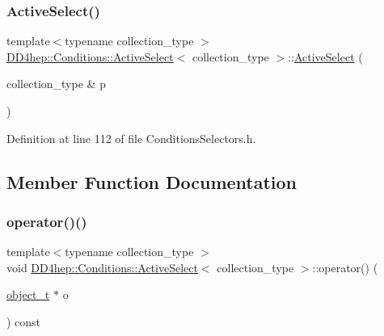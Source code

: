 \subsubsection{\texorpdfstring{Active\+Select()}{ActiveSelect()}}
{\footnotesize\ttfamily template$<$typename collection\+\_\+type $>$ \\
\hyperlink{class_d_d4hep_1_1_conditions_1_1_active_select}{D\+D4hep\+::\+Conditions\+::\+Active\+Select}$<$ collection\+\_\+type $>$\+::\hyperlink{class_d_d4hep_1_1_conditions_1_1_active_select}{Active\+Select} (\begin{DoxyParamCaption}\item[{collection\+\_\+type \&}]{p }\end{DoxyParamCaption})\hspace{0.3cm}{\ttfamily [inline]}}



Definition at line 112 of file Conditions\+Selectors.\+h.



\subsection{Member Function Documentation}
\hypertarget{class_d_d4hep_1_1_conditions_1_1_active_select_a4e7bd6374aeb6d984277d7f6a7513438}{}\label{class_d_d4hep_1_1_conditions_1_1_active_select_a4e7bd6374aeb6d984277d7f6a7513438} 
\subsubsection{\texorpdfstring{operator()()}{operator()()}\hspace{0.1cm}{\footnotesize\ttfamily [1/4]}}
{\footnotesize\ttfamily template$<$typename collection\+\_\+type $>$ \\
void \hyperlink{class_d_d4hep_1_1_conditions_1_1_active_select}{D\+D4hep\+::\+Conditions\+::\+Active\+Select}$<$ collection\+\_\+type $>$\+::operator() (\begin{DoxyParamCaption}\item[{\hyperlink{class_d_d4hep_1_1_conditions_1_1_cond_____oper_a4229491e49bfd21058dff10125a73f63}{object\+\_\+t} $\ast$}]{o }\end{DoxyParamCaption}) const\hspace{0.3cm}{\ttfamily [inline]}}



